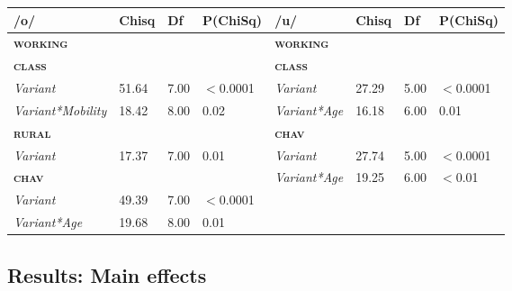 \documentclass[PWPL]{article}
\begin{document}
 \begin{table}[ht]
 \small
\centering
\begin{tabular}{llllllll}
  \hline
 /o/& Chisq & Df & P(ChiSq) & /u/&Chisq & Df & P(ChiSq) \\ 
  \hline
 \textbf{\textsc{working}}&&&  &\textbf{\textsc{working}}&&&\\ 
  \textbf{\textsc{class}}&&&  & \textbf{\textsc{class}}&&&\\
  \textit{Variant}& 51.64 & 7.00 & $<$0.0001 &  \textit{Variant}& 27.29 & 5.00 & $<$0.0001 \\  
  \textit{Variant*Mobility}& 18.42 & 8.00 & 0.02 &  \textit{Variant*Age}& 16.18 & 6.00 & 0.01 \\ 
\textbf{\textsc{rural}}&&&  & \textbf{\textsc{chav}}&&&\\ 
  \textit{Variant}& 17.37 & 7.00 & 0.01 &  \textit{Variant}& 27.74 & 5.00 & $<$0.0001 \\ 
\textbf{\textsc{chav}}&&& &  \textit{Variant*Age}& 19.25 & 6.00 & $<$0.01 \\ 
  \textit{Variant}& 49.39 & 7.00 & $<$0.0001&&&& \\ 
  \textit{Variant*Age}& 19.68 & 8.00 & 0.01&&&& \\
   \hline
\end{tabular}
\end{table}
\newpage
\subsection{Results: Main effects}
\end{document}
